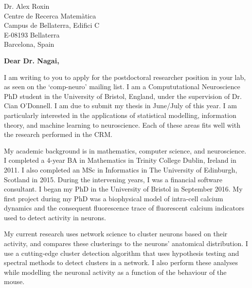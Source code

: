 \documentclass[11pt]{letter} %
\begin{document}

\begin{letter}{Dr. Alex Roxin \\ 
  Centre de Recerca Matem\`{a}tica \\ 
  Campus de Bellaterra, Edifici C \\
  E-08193 Bellaterra \\
  Barcelona, Spain} %


  \opening{\textbf{Dear Dr. Nagai,}}
  
  I am writing to you to apply for the postdoctoral researcher position in your lab, as seen on the `comp-neuro' mailing list. I am a Compututational Neuroscience PhD student in the University of Bristol, England, under the supervision of Dr. Cian O'Donnell. I am due to submit my thesis in June/July of this year. I am particularly interested in the applications of statistical modelling, information theory, and machine learning to neuroscience. Each of these areas fits well with the research performed in the CRM.

  My academic background is in mathematics, computer science, and neuroscience. I completed a 4-year BA in Mathematics in Trinity College Dublin, Ireland in 2011. I also completed an MSc in Informatics in The University of Edinburgh, Scotland in 2015. During the intervening years, I was a financial software consultant. I began my PhD in the University of Bristol in September 2016. My first project during my PhD was a biophysical model of intra-cell calcium dynamics and the consequent fluorescence trace of fluorescent calcium indicators used to detect activity in neurons. 

  My current research uses network science to cluster neurons based on their activity, and compares these clusterings to the neurons' anatomical distribution. I use a cutting-edge cluster detection algorithm that uses hypothesis testing and spectral methods to detect clusters in a network. I also perform these analyses while modelling the neuronal activity as a function of the behaviour of the mouse.


\end{letter}
\end{document}
